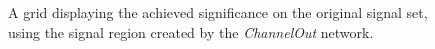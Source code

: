 \begin{figure}
    \caption{A grid displaying the achieved significance on the original signal set, using the signal region 
    created by the \emph{ChannelOut} network.}
    \label{fig:ChannelOutGridSig}
\end{figure}

